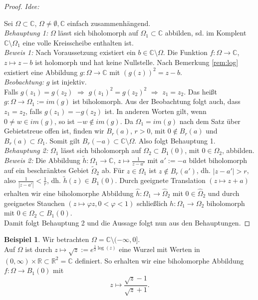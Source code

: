 \documentclass[11pt,titlepage]{article}
\theoremstyle{definition}
\newtheorem{example}[theorem]{Beispiel}
\theoremstyle{remark}
\begin{document}
	\begin{proof}
		\textsl{Idee:}
		
		
		Sei $\Omega\subset\mathbb{C}$, $\Omega\neq\emptyset,\mathbb{C}$ einfach zusammenhängend. \\
		\textsl{Behauptung 1:} $\Omega$ lässt sich biholomorph auf $\Omega_1\subset\mathbb{C}$ 
		abbilden, sd. im Komplent $\mathbb{C}\setminus\Omega_1$ eine volle Kreisscheibe 
		enthalten ist. \\
		\textsl{Beweis 1:} Nach Voraussetzung existiert ein $b\in\mathbb{C}\setminus\Omega$. Die 
		Funktion $f:\Omega\to\mathbb{C}$, $z\mapsto z-b$ ist holomorph und hat keine Nullstelle. 
		Nach Bemerkung \ref{rem:log} existiert eine Abbildung $g:\Omega\to\mathbb{C}$ mit 
		$(g(z))^2=z-b$. \\
		\textsl{Beobachtung:} $g$ ist injektiv. \\
		Falls $g(z_1)=g(z_2)$ $\Rightarrow$ $g(z_1)^2=g(z_2)^2$ $\Rightarrow$ $z_1=z_2$. Das heißt 
		$g:\Omega\to\Omega_1:=im(g)$ ist biholomorph. Aus der Beobachtung folgt auch, dass 
		$z_1=z_2$, falls $g(z_1)=-g(z_2)$ ist. In anderen Worten gilt, wenn $0\neq w\in im(g)$, so ist 
		$-w\notin im(g)$. Da $\Omega_1=im(g)$ nach dem Satz über Gebietstreue offen ist, finden wir 
		$B_r(a)$, $r>0$, mit $0\notin B_r(a)$ und $B_r(a)\subset\Omega_1$. Somit gilt $B_r(-a)\subset
		\mathbb{C}\setminus\Omega$. Also folgt Behauptung 1.\\
		\textsl{Behauptung 2:} $\Omega_1$ lässt sich biholomorph auf $\Omega_2\subset B_1(0)$, mit 
		$0\in \Omega_2$, abbilden. \\
		\textsl{Beweis 2:} Die Abbildung $\tilde{h}:\Omega_1\to\mathbb{C}$, $z\mapsto \frac{1}{z-a'}$ mit 
		$a':=-a$ bildet 
		biholomorph auf ein beschränktes Gebiet $\tilde{\Omega}_2$ ab. Für $z\in \Omega_1$ 
		ist $z\notin B_r(a')$, dh. $|z-a'|>r$, also $\frac{1}{|z-a'|}<\frac{1}{r}$, dh. $\tilde{h}(z)\in B_1(0)$. 
		Durch geeignete Translation $(z\mapsto z+a)$ erhalten wir eine biholomorphe Abbildung 
		$\hat{h}:\Omega_1\to\hat{\Omega}_2$ mit $0\in \hat{\Omega}_2$ und durch geeignetes 
		Stauchen $(z\mapsto \varphi z, 0<\varphi<1)$ schließlich $h:\Omega_1\to\Omega_2$ 
		biholomorph mit $0\in\Omega_2\subset B_1(0)$.\\
		Damit folgt Behauptung 2 und die Aussage folgt nun aus den Behauptungen.
	\end{proof}
	
	\begin{example}
		Wir betrachten $\Omega=\mathbb{C}\setminus(-\infty,0]$. \\
		Auf $\Omega$ ist durch $z\mapsto \sqrt{z}:=e^{\frac{1}{2}\log(z)}$ eine Wurzel mit Werten in 
		$(0,\infty)\times\mathbb{R}\subset \mathbb{R}^2=\mathbb{C}$ definiert. So erhalten wir 
		eine biholomorphe Abbildung $f:\Omega\to B_1(0)$ mit
		\[z\mapsto \frac{\sqrt{z}-1}{\sqrt{z}+1}.\]
	\end{example}
	
\end{document}
